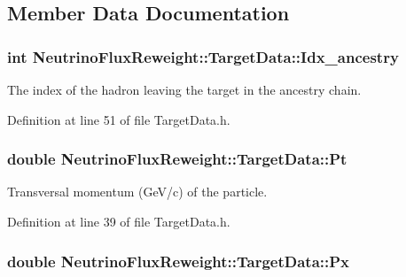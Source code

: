 \subsection{Member Data Documentation}
\hypertarget{class_neutrino_flux_reweight_1_1_target_data_a8aa08501d2e0afbddf5b21c241fd5f15}{
\subsubsection[{Idx\-\_\-ancestry}]{\setlength{\rightskip}{0pt plus 5cm}int Neutrino\-Flux\-Reweight\-::\-Target\-Data\-::\-Idx\-\_\-ancestry}}\label{class_neutrino_flux_reweight_1_1_target_data_a8aa08501d2e0afbddf5b21c241fd5f15}


The index of the hadron leaving the target in the ancestry chain. 



Definition at line 51 of file Target\-Data.\-h.

\hypertarget{class_neutrino_flux_reweight_1_1_target_data_a80699c279341622734429a019e6b8439}{
\subsubsection[{Pt}]{\setlength{\rightskip}{0pt plus 5cm}double Neutrino\-Flux\-Reweight\-::\-Target\-Data\-::\-Pt}}\label{class_neutrino_flux_reweight_1_1_target_data_a80699c279341622734429a019e6b8439}


Transversal momentum (Ge\-V/c) of the particle. 



Definition at line 39 of file Target\-Data.\-h.

\hypertarget{class_neutrino_flux_reweight_1_1_target_data_a8c905649babb8529ba1d6364c660d41f}{
\subsubsection[{Px}]{\setlength{\rightskip}{0pt plus 5cm}double Neutrino\-Flux\-Reweight\-::\-Target\-Data\-::\-Px}}\label{class_neutrino_flux_reweight_1_1_target_data_a8c905649babb8529ba1d6364c660d41f}


